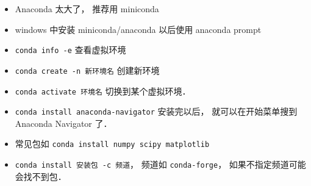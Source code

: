 
\begin{itemize}
\item Anaconda 太大了， 推荐用 miniconda
\item windows 中安装 miniconda/anaconda 以后使用 anaconda prompt
\item \verb|conda info -e| 查看虚拟环境
\item \verb|conda create -n 新环境名| 创建新环境
\item \verb|conda activate 环境名| 切换到某个虚拟环境．
\item \verb|conda install anaconda-navigator| 安装完以后， 就可以在开始菜单搜到 Anaconda Navigator 了．
\item 常见包如 \verb|conda install numpy scipy matplotlib|
\item \verb|conda install 安装包 -c 频道|， 频道如 \verb|conda-forge|， 如果不指定频道可能会找不到包．
\end{itemize}
